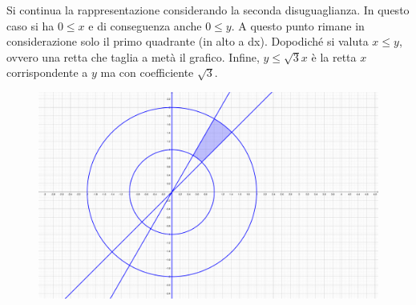 \documentclass[a4paper]{article}
\begin{document}
	\noindent
	Si continua la rappresentazione considerando la seconda disuguaglianza. In questo caso si ha $0 \le x$ e di conseguenza anche $0 \le y$. A questo punto rimane in considerazione solo il primo quadrante (in alto a dx). Dopodiché si valuta $x \le y$, ovvero una retta che taglia a metà il grafico. Infine, $y \le \sqrt{3}x$ è la retta $x$ corrispondente a $y$ ma con coefficiente $\sqrt{3}$.
	\begin{figure}[!htp]
		\centering
		\includegraphics[width=.8\textwidth]{img/integrali_doppi-coordinate_polari-2.pdf}
	\end{figure}

	\newpage
	
\end{document}
